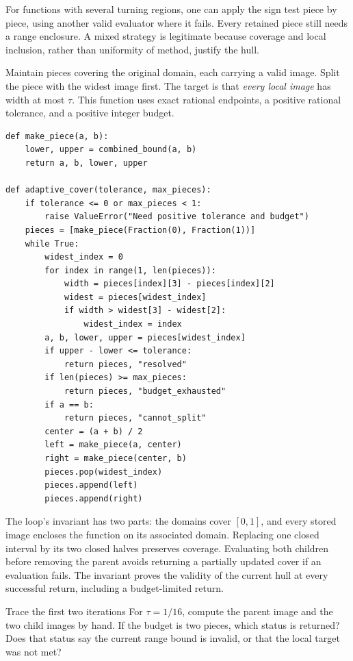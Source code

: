 For functions with several turning regions, one can apply the sign test
piece by piece, using another valid evaluator where it fails. Every retained
piece still needs a range enclosure. A mixed strategy is legitimate because
coverage and local inclusion, rather than uniformity of method, justify the hull.

\newpage
{}
Maintain pieces covering the original domain, each carrying a valid image.
Split the piece with the widest image first. The target is that \emph{every
local image} has width at most $\tau$. This function uses exact rational
endpoints, a positive rational tolerance, and a positive integer budget.
\begin{lstlisting}
def make_piece(a, b):
    lower, upper = combined_bound(a, b)
    return a, b, lower, upper

def adaptive_cover(tolerance, max_pieces):
    if tolerance <= 0 or max_pieces < 1:
        raise ValueError("Need positive tolerance and budget")
    pieces = [make_piece(Fraction(0), Fraction(1))]
    while True:
        widest_index = 0
        for index in range(1, len(pieces)):
            width = pieces[index][3] - pieces[index][2]
            widest = pieces[widest_index]
            if width > widest[3] - widest[2]:
                widest_index = index
        a, b, lower, upper = pieces[widest_index]
        if upper - lower <= tolerance:
            return pieces, "resolved"
        if len(pieces) >= max_pieces:
            return pieces, "budget_exhausted"
        if a == b:
            return pieces, "cannot_split"
        center = (a + b) / 2
        left = make_piece(a, center)
        right = make_piece(center, b)
        pieces.pop(widest_index)
        pieces.append(left)
        pieces.append(right)
\end{lstlisting}

The loop's invariant has two parts: the domains cover $[0,1]$, and every
stored image encloses the function on its associated domain. Replacing one
closed interval by its two closed halves preserves coverage. Evaluating both
children before removing the parent avoids returning a partially updated cover
if an evaluation fails. The invariant proves the validity of the current hull
at every successful return, including a budget-limited return.

\begin{question}{Trace the first two iterations}
For $\tau=1/16$, compute the parent image and the two child images by hand.
If the budget is two pieces, which status is returned? Does that status say
the current range bound is invalid, or that the local target was not met?
\end{question}


